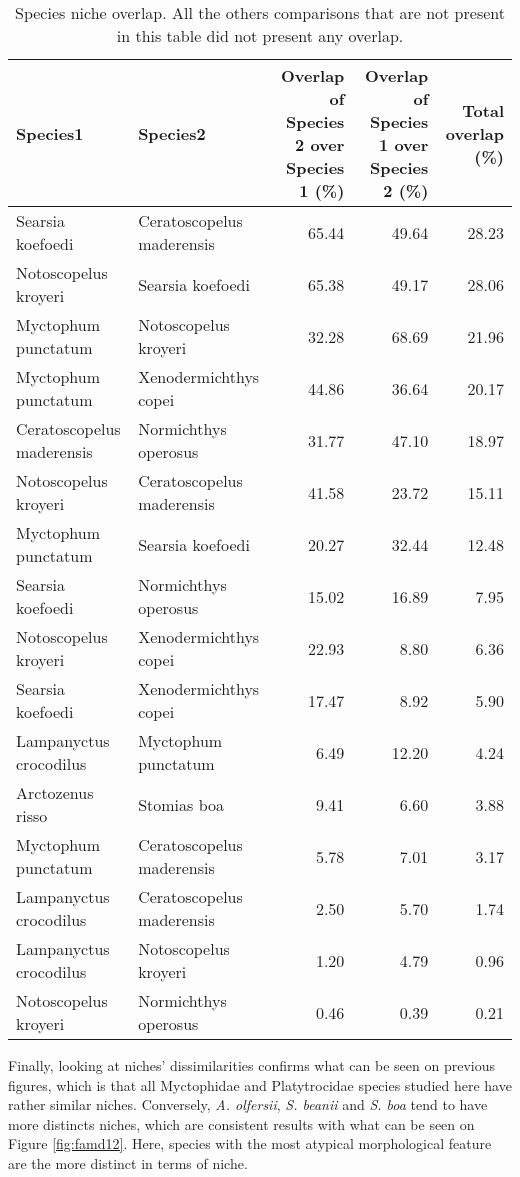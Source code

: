 \begin{table}[ht]
\centering
\caption{Species niche overlap. All the others comparisons that are not present in this table did not present any overlap.}
\label{table:ell_ovlp}
\begin{adjustbox}{max width=1.1\textwidth,center}
\begin{tabular}{llrrr}
  \hline
Species1 & Species2 & Overlap of Species 2 over Species 1 (\%) & Overlap of Species 1 over Species 2 (\%) & Total overlap (\%)\\ 
  \hline
Searsia koefoedi & Ceratoscopelus maderensis & 65.44 & 49.64 & 28.23 \\ 
  Notoscopelus kroyeri & Searsia koefoedi & 65.38 & 49.17 & 28.06 \\ 
  Myctophum punctatum & Notoscopelus kroyeri & 32.28 & 68.69 & 21.96 \\ 
  Myctophum punctatum & Xenodermichthys copei & 44.86 & 36.64 & 20.17 \\ 
  Ceratoscopelus maderensis & Normichthys operosus & 31.77 & 47.10 & 18.97 \\ 
  Notoscopelus kroyeri & Ceratoscopelus maderensis & 41.58 & 23.72 & 15.11 \\ 
  Myctophum punctatum & Searsia koefoedi & 20.27 & 32.44 & 12.48 \\ 
  Searsia koefoedi & Normichthys operosus & 15.02 & 16.89 & 7.95 \\ 
  Notoscopelus kroyeri & Xenodermichthys copei & 22.93 & 8.80 & 6.36 \\ 
  Searsia koefoedi & Xenodermichthys copei & 17.47 & 8.92 & 5.90 \\ 
  Lampanyctus crocodilus & Myctophum punctatum & 6.49 & 12.20 & 4.24 \\ 
  Arctozenus risso & Stomias boa & 9.41 & 6.60 & 3.88 \\ 
  Myctophum punctatum & Ceratoscopelus maderensis & 5.78 & 7.01 & 3.17 \\ 
  Lampanyctus crocodilus & Ceratoscopelus maderensis & 2.50 & 5.70 & 1.74 \\ 
  Lampanyctus crocodilus & Notoscopelus kroyeri & 1.20 & 4.79 & 0.96 \\ 
  Notoscopelus kroyeri & Normichthys operosus & 0.46 & 0.39 & 0.21 \\ 
   \hline
\end{tabular}
\end{adjustbox}
\end{table}

Finally, looking at niches' dissimilarities confirms what can be seen on previous figures, which is that all Myctophidae and Platytrocidae species studied here have rather similar niches. Conversely, \textit{A. olfersii}, \textit{S. beanii} and \textit{S. boa} tend to have more distincts niches, which are consistent results with what can be seen on Figure \ref{fig:famd12}. Here, species with the most atypical morphological feature are the more distinct in terms of niche. 

